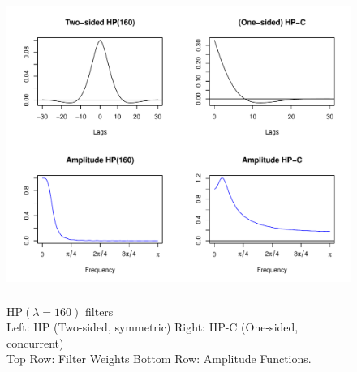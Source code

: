 \documentclass[11pt,a4paper]{article}
\begin{document}
\begin{figure}[h]
    \begin{center}
        \includegraphics[height=4in, width=5.5in]{./Figures/hp_160.pdf}
        \caption{HP$(\lambda=160)$ filters\\
        Left: HP (Two-sided, symmetric) \qquad Right: HP-C (One-sided, concurrent)\\
        Top Row: Filter Weights \qquad \qquad \quad Bottom Row: Amplitude Functions.
        \label{hp_160}}
    \end{center}
\end{figure}


\end{document}
